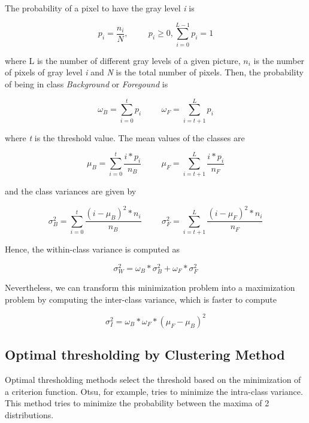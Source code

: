 \documentclass[12]{article}
\begin{document}
The probability of a pixel to have the gray level \textit{i} is
\vspace{-0.5cm}
\begin{center}
$$ p_i = \frac{n_i}{N}, \hspace{1cm} p_i \geqslant 0, \sum_{i = 0}^{L - 1} p_i = 1  $$
\end{center}
where L is the number of different gray levels of a given picture, $n_i$ is the number of pixels of gray level \textit{i} and \textit{N} is the total number of pixels. Then, the probability of being in class \textit{Background} or \textit{Foregound} is
\vspace{-0.5cm}
\begin{center}
$$ \omega_B = \sum_{i = 0}^{t} p_i \hspace{1cm} \omega_F = \sum_{i = t + 1}^{L} p_i $$
\end{center}
where \textit{t} is the threshold value. The mean values of the classes are
\vspace{-0.5cm}
\begin{center}
$$ \mu_B = \sum_{i = 0}^{t} \frac{i * p_i}{n_B} \hspace{1cm} \mu_F = \sum_{i = t + 1}^{L} \frac{i * p_i}{n_F} $$
\end{center}
and the class variances are given by
\vspace{-0.5cm}
\begin{center}
$$ \sigma_{B}^{2} = \sum_{i = 0}^{t} \frac{(i - \mu_B)^2 * n_i}{n_B} \hspace{1cm} \sigma_{F}^{2} = \sum_{i = t + 1}^{L} \frac{(i - \mu_F)^2 * n_i}{n_F} $$
\end{center}
Hence, the within-class variance is computed as
\vspace{-0.5cm}
\begin{center}
$$ \sigma_{W}^{2} = \omega_B * \sigma_{B}^{2} + \omega_F * \sigma_{F}^{2} $$
\end{center}
Nevertheless, we can transform this minimization problem into a maximization problem by computing the inter-class variance, which is faster to compute
\vspace{-0.5cm}
\begin{center}
$$ \sigma_{I}^{2} = \omega_B * \omega_F * (\mu_F - \mu_B)^2 $$
\end{center}

\subsection{Optimal thresholding by Clustering Method}
Optimal thresholding methods select the threshold based on the minimization of a criterion function. Otsu, for example, tries to minimize the intra-class variance. This method tries to minimize the probability between the maxima of 2 distributions.
\end{document}
